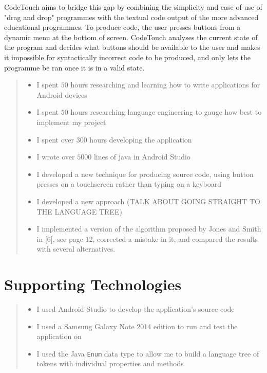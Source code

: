 \documentclass[ %
                    author={Jonathan Rankin},
                supervisor={Dr. David May, Dr. Ian Holyer},
                    degree={MEng},
                     title={CodeTouch},
                  subtitle={A Revolutionary Way To Program Real Code On Touch Screen Devices},
                      type={enterprise},
                      year={2015 } ]{dissertation}
\begin{document}
CodeTouch aims to bridge this gap by combining the simplicity and ease of use of "drag and drop" programmes with the textual code output of the more advanced educational programmes. To produce code, the user presses buttons from a dynamic menu at the bottom of screen. CodeTouch analyses the current state of the program and decides what buttons should be available to the user and makes it impossible for syntactically incorrect code to be produced, and only lets the programme be ran once it is in a valid state.

\begin{quote}
\noindent
\begin{itemize}
\item I spent $50$ hours researching and learning how to write applications for Android devices
\item I spent $50$ hours researching language engineering to gauge how best to implement my project
\item I spent over $300$ hours developing the application
\item I wrote over $5000$ lines of java in Android Studio
\item I developed a new technique for producing source code, using button presses on a touchscreen rather than typing on a keyboard 
\item I developed a new approach (TALK ABOUT GOING STRAIGHT TO THE LANGUAGE TREE)
\item I implemented a version of the algorithm proposed by Jones and 
      Smith in [6], see page $12$, corrected a mistake in it, and 
      compared the results with several alternatives.
\end{itemize}
\end{quote}



\chapter*{Supporting Technologies}


\vspace{1cm} 


\begin{quote}
\noindent
\begin{itemize}
\item I used Android Studio \cite{AndroidStudio} to develop the application's source code
\item I used a Samsung Galaxy Note 2014 edition to run and test the application on \cite{GalaxyNote}
\item I used the Java {\tt Enum} data type to allow me to build a language tree of tokens with individual properties and methods
\end{itemize}
\end{quote}
\end{document}
